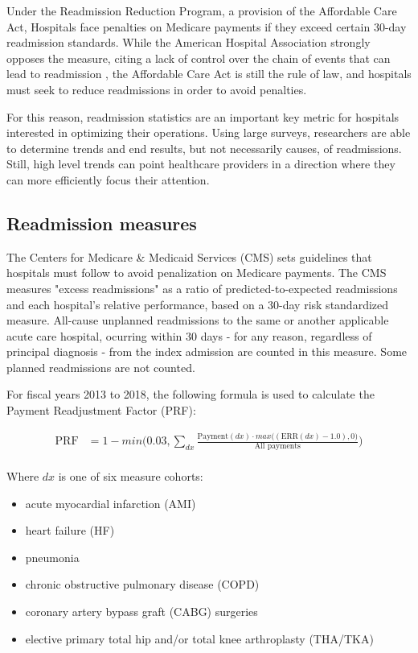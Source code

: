 \documentclass[12pt]{ociamthesis}\usepackage[]{graphicx}\usepackage[]{color}
\begin{document}
Under the Readmission Reduction Program, a provision of the Affordable Care Act, 
Hospitals face penalties on Medicare payments if they exceed certain 30-day readmission standards. While the 
American Hospital Association strongly opposes the measure, citing a lack of control over the chain of events
that can lead to readmission \cite{Rice2015, AHA2018}, the Affordable Care Act is still the rule of law, and hospitals must seek
to reduce readmissions in order to avoid penalties.

For this reason, readmission statistics are an important key metric for hospitals interested in optimizing 
their operations. Using large surveys, researchers are able to determine trends and end results, but not necessarily 
causes, of readmissions. Still, high level trends can point healthcare providers in a direction where they can
more efficiently focus their attention. 

\subsection{Readmission measures}

The Centers for Medicare \& Medicaid Services (CMS) sets guidelines that hospitals must follow to avoid penalization on Medicare payments. 
The CMS measures "excess readmissions" as a ratio of predicted-to-expected readmissions and each hospital's relative performance, based on
a 30-day risk standardized measure. All-cause unplanned readmissions to the same or another applicable acute care hospital, 
ocurring within 30 days - for any reason, regardless of principal diagnosis - from the index admission are counted in this measure.
Some planned readmissions are not counted. \cite{HRRP}

For fiscal years 2013 to 2018, the following formula is used to calculate the Payment Readjustment Factor (PRF):

\begin{equation} \label{prf}
\begin{split}
  \text{PRF} &= 1 - min\bigg(0.03, \sum_{dx} \frac{\text{Payment}(dx) \cdot max\big((\text{ERR}(dx) - 1.0), 0\big)}{\text{All payments}}\bigg) \\
\end{split}
\end{equation}
 
Where $dx$ is one of six measure cohorts: 

\begin{itemize}
  \item acute myocardial infarction (AMI)
  \item heart failure (HF)
  \item pneumonia
  \item chronic obstructive pulmonary disease (COPD)
  \item coronary artery bypass graft (CABG) surgeries
  \item elective primary total hip and/or total knee arthroplasty (THA/TKA)
\end{itemize}
\end{document}
